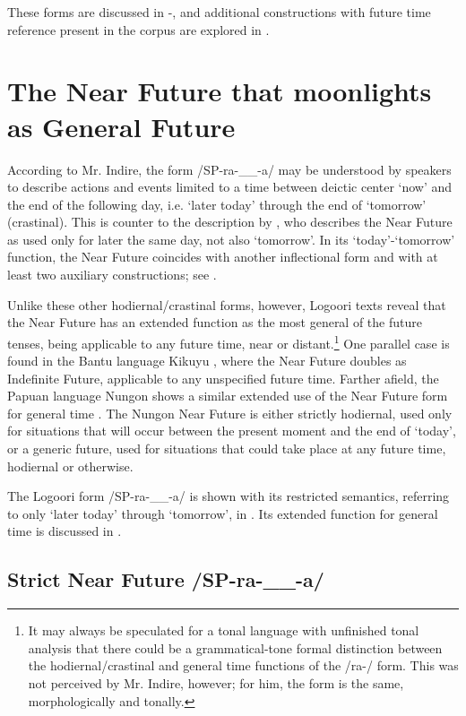 \documentclass[output=paper]{langsci/langscibook}
\begin{document}
These forms are discussed in -, and additional constructions with future time reference present in the corpus are explored in .

\section{The Near Future that moonlights as General Future} \label{sec:sarvasy:3}

According to Mr. Indire, the form /SP-ra-\_\_-a/ may be understood by speakers to describe actions and events limited to a time between deictic center ‘now’ and the end of the following day, i.e. ‘later today’ through the end of ‘tomorrow’ (crastinal). This is counter to the description by \citet[174]{Leung1991}, who describes the Near Future as used only for later the same day, not also ‘tomorrow’. In its ‘today’-‘tomorrow’ function, the Near Future coincides with another inflectional form and with at least two auxiliary constructions; see .

Unlike these other hodiernal/crastinal forms, however, Logoori texts reveal that the Near Future has an extended function as the most general of the future tenses, being applicable to any future time, near or distant.\footnote{ It may always be speculated for a tonal language with unfinished tonal analysis that there could be a grammatical-tone formal distinction between the hodiernal/crastinal and general time functions of the /ra-/ form. This was not perceived by Mr. Indire, however; for him, the form is the same, morphologically and tonally.} One parallel case is found in the Bantu language Kikuyu \citep[19]{Johnson1977}, where the Near Future doubles as Indefinite Future, applicable to any unspecified future time. Farther afield, the Papuan language Nungon shows a similar extended use of the Near Future form for general time \citep{Sarvasy2014}. The Nungon Near Future is either strictly hodiernal, used only for situations that will occur between the present moment and the end of ‘today’, or a generic future, used for situations that could take place at any future time, hodiernal or otherwise. 

The Logoori form /SP-ra-\_\_-a/ is shown with its restricted semantics, referring to only ‘later today’ through ‘tomorrow’, in . Its extended function for general time is discussed in .

\subsection{Strict Near Future /SP-ra-\_\_-a/}
\label{sec:sarvasy:3.1}
\end{document}
